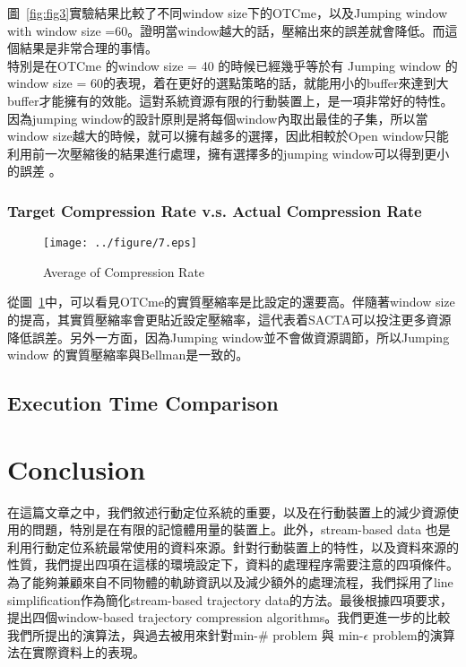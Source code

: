 \documentclass[12pt]{article}
\begin{document}
\begin{CJK}{UTF8}{bsmi}
\begin{figure}[ht]
\begin{center}
\end{center}
\end{figure}


圖~\ref{fig:fig3}實驗結果比較了不同window size下的OTCme，以及Jumping window with window size =60。證明當window越大的話，壓縮出來的誤差就會降低。而這個結果是非常合理的事情。\\

特別是在OTCme 的window size = 40 的時候已經幾乎等於有 Jumping window 的window size = 60的表現，着在更好的選點策略的話，就能用小的buffer來達到大buffer才能擁有的效能。這對系統資源有限的行動裝置上，是一項非常好的特性。\\

因為jumping window的設計原則是將每個window內取出最佳的子集，所以當window size越大的時候，就可以擁有越多的選擇，因此相較於Open window只能利用前一次壓縮後的結果進行處理，擁有選擇多的jumping window可以得到更小的誤差 。\\


\subsubsection{Target Compression Rate v.s. Actual Compression Rate}

\begin{figure}[ht]
\begin{center}
\texttt{[image: ../figure/7.eps]}
\caption{Average of Compression Rate}
\label{fig:fig7}
\end{center}
\end{figure}

從圖~\ref{fig:fig7}中，可以看見OTCme的實質壓縮率是比設定的還要高。伴隨著window size的提高，其實質壓縮率會更貼近設定壓縮率，這代表着SACTA可以投注更多資源降低誤差。另外一方面，因為Jumping window並不會做資源調節，所以Jumping window 的實質壓縮率與Bellman是一致的。





\subsection{Execution Time Comparison}




\section{Conclusion}

在這篇文章之中，我們敘述行動定位系統的重要，以及在行動裝置上的減少資源使用的問題，特別是在有限的記憶體用量的裝置上。此外，stream-based data 也是利用行動定位系統最常使用的資料來源。針對行動裝置上的特性，以及資料來源的性質，我們提出四項在這樣的環境設定下，資料的處理程序需要注意的四項條件。為了能夠兼顧來自不同物體的軌跡資訊以及減少額外的處理流程，我們採用了line simplification作為簡化stream-based trajectory data的方法。最後根據四項要求，提出四個window-based trajectory compression algorithms。我們更進一步的比較我們所提出的演算法，與過去被用來針對min-\# problem 與 min-$\epsilon$ problem的演算法在實際資料上的表現。\\




\end{CJK}
\end{document}
